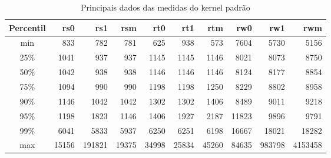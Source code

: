 \begin{table}[h!]
\centering
\begin{center}
\begin{tabular}{|c|r|r|r|r|r|r|r|r|r|}
\toprule
Percentil &    rs0 &     rs1 &    rsm &    rt0 &    rt1 &    rtm &    rw0 &     rw1 &      rwm \\
\midrule
    min &    833 &     782 &    781 &    625 &    938 &    573 &   7604 &    5730 &     5156 \\
    25\% &   1041 &     937 &    937 &   1145 &   1145 &   1146 &   8021 &    8073 &     8750 \\
    50\% &   1042 &     938 &    938 &   1146 &   1146 &   1146 &   8124 &    8177 &     8854 \\
    75\% &   1094 &     990 &    990 &   1198 &   1198 &   1250 &   8229 &    8802 &     8958 \\
    90\% &   1146 &    1042 &   1042 &   1302 &   1302 &   1406 &   8489 &    9011 &     9218 \\
    95\% &   1198 &    1823 &   1146 &   1406 &   1927 &   2187 &  11823 &    9896 &     9791 \\
    99\% &   6041 &    5833 &   5937 &   6250 &   6251 &   6198 &  16667 &   18021 &    18282 \\
    max &  15156 &  191821 &  19375 &  34998 &  25834 &  45260 &  84635 &  983798 &  4153458 \\
\bottomrule
\end{tabular}
\end{center}
\caption{Principais dados das medidas do kernel padrão}
\label{table:rpi}
\end{table}

